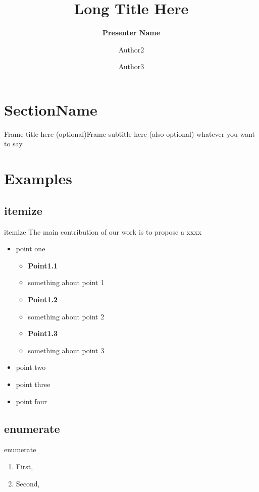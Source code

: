 \documentclass{beamer}
\title[Short Title]{Long Title Here}
\author[Presenter Name]{\textbf{Presenter Name} \and Author2 \and Author3}
\institute[Fudan University]{
    School of Computer Science, Fudan University, Shanghai, China \\
    Shanghai Key Laboratory of Data Science, Shanghai, China \\
    Shanghai Institute of Intelligent Electronics \& Systems \\~\\
    \tiny{This work is partially supported by xxx}
}
\begin{document}
\begin{frame}
  \titlepage
\end{frame}

\section{SectionName}
\begin{frame}{Frame title here (optional)}{Frame subtitle here (also optional)}
  whatever you want to say
\end{frame}

\section{Examples}

\subsection{itemize}
\begin{frame}[t]{itemize}
  The main contribution of our work is to propose a xxxx
  \begin{itemize}
    \item point one
          \begin{itemize}
            \item \textbf{Point1.1}
            \item something about point 1
            \item \textbf{Point1.2}
            \item something about point 2
            \item \textbf{Point1.3}
            \item something about point 3
          \end{itemize}
    \item point two
    \item point three
    \item point four
  \end{itemize}
\end{frame}

\subsection{enumerate}
\begin{frame}[t]{enumerate}
  \begin{enumerate}
    \item First,
    \item Second,
  \end{enumerate}
\end{frame}
\end{document}
